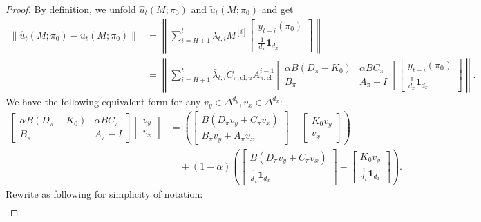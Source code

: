 \begin{proof}
By definition, we unfold $\hat{u}_t(M;\pi_0)$ and $\tilde{u}_t(M;\pi_0)$ and get
\begin{align*}
\|\hat{u}_t(M;\pi_0)-\tilde{u}_t(M;\pi_0)\|&=\left\|\sum_{i=H+1}^t\bar{\lambda}_{t,i}M^{[i]}\begin{bmatrix}
    y_{t-i}(\pi_0) \\
    \frac{1}{d_x}\mathbf{1}_{d_x}
\end{bmatrix} \right\|\\
&=\left\|\sum_{i=H+1}^t \bar{\lambda}_{t,i}C_{\pi,\mathrm{cl},u}A_{\pi,\mathrm{cl}}^{i-1}\begin{bmatrix}
 \alpha B (D_{\pi}-K_0) & \alpha B C_{\pi} \\
    B_{\pi} & A_{\pi}-I
\end{bmatrix}
\begin{bmatrix}
    y_{t-i}(\pi_0) \\
    \frac{1}{d_x}\mathbf{1}_{d_x}
\end{bmatrix}\right\|.
\end{align*}
We have the following equivalent form for any $v_y\in \Delta^{d_y}, v_x\in \Delta^{d_x}$:
\begin{align*}
\begin{bmatrix}
 \alpha B (D_{\pi}-K_0) & \alpha B C_{\pi} \\
    B_{\pi} & A_{\pi}-I
\end{bmatrix}
\begin{bmatrix}
    v_y \\
    v_x
\end{bmatrix}&=\left(\begin{bmatrix}
    B(D_{\pi}v_y+C_{\pi}v_x) \\ B_{\pi}v_y+A_{\pi}v_x
\end{bmatrix}-\begin{bmatrix}
    K_0 v_y \\ v_x
\end{bmatrix}\right) \\
& \quad + (1-\alpha)\left(\begin{bmatrix}
    B(D_{\pi}v_y+C_{\pi}v_x) \\ \frac{1}{d_x}\mathbf{1}_{d_x}
\end{bmatrix}-\begin{bmatrix}
    K_0 v_y \\ \frac{1}{d_x}\mathbf{1}_{d_x}
\end{bmatrix}\right).
\end{align*}
Rewrite as following for simplicity of notation:
\begin{align*}

\end{align*}
\end{proof}
